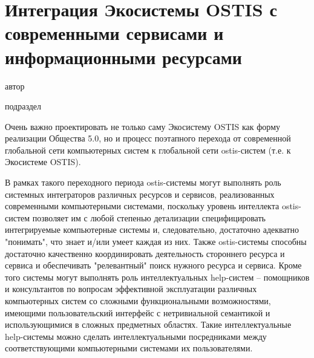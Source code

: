 \chapter{Интеграция Экосистемы OSTIS с современными сервисами и информационными ресурсами}
{\label{chapter_integration}}

\vspace{-7\baselineskip}

\begin{SCn}
\begin{scnrelfromlist}{автор}
\end{scnrelfromlist}

\bigskip


\bigskip

\begin{scnrelfromlist}{подраздел}
\end{scnrelfromlist}

\end{SCn}

Очень важно проектировать не только саму Экосистему OSTIS как форму реализации Общества 5.0, но и процесс поэтапного перехода от современной глобальной сети компьютерных систем к глобальной сети ostis-систем (т.е. к Экосистеме OSTIS).

В рамках такого переходного периода ostis-системы могут выполнять роль системных интеграторов различных ресурсов и сервисов, реализованных современными компьютерными системами, поскольку уровень интеллекта ostis-систем позволяет им с любой степенью детализации специфицировать интегрируемые компьютерные системы и, следовательно, достаточно адекватно "понимать", что знает и/или умеет каждая из них. 
Также ostis-системы способны достаточно качественно координировать деятельность стороннего ресурса и сервиса и обеспечивать "релевантный" поиск нужного ресурса и сервиса. 
Кроме того системы могут выполнять роль интеллектуальных help-систем – помощников и консультантов по вопросам эффективной эксплуатации различных компьютерных систем со сложными функциональными возможностями, имеющими пользовательский интерфейс с нетривиальной семантикой и использующимися в сложных предметных областях. 
Такие интеллектуальные help-системы можно сделать интеллектуальными посредниками между соответствующими компьютерными системами их пользователями.

